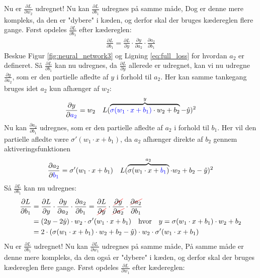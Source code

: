 \documentclass{article}
\newcommand{\figureref}[1]{Figur \ref{#1}}
\newcommand\Ccancel[2][black]{
    \let\OldcancelColor\CancelColor
    \renewcommand\CancelColor{\color{#1}}
    \cancel{#2}
    \renewcommand\CancelColor{\OldcancelColor}
}
\begin{document}
Nu er $\frac{\partial L}{\partial w_2}$ udregnet! Nu kan $\frac{\partial L}{\partial b_1}$ udregnes på samme måde, Dog er denne mere kompleks, da den er "dybere" i kæden, og derfor skal der bruges kædereglen flere gange. Først opdeles $\frac{\partial L}{\partial b_1}$ efter kædereglen:
\begin{align}
  \frac{\partial L}{\partial b_1} = \frac{\partial L}{\partial y} \cdot \frac{\partial y}{\partial a_2} \cdot \frac{\partial a_2}{\partial b_1}
\end{align}
Beskue \figureref{fig:neural_network3} og Ligning \eqref{eq:full_loss} for hvordan $a_2$ er defineret. Så $\frac{\partial L}{\partial b_1}$ kan nu udregnes, da $\frac{\partial L}{\partial y}$ allerede er udregnet, kan vi nu udregne $\frac{\partial y}{\partial a_2}$, som er den partielle afledte af $y$ i forhold til $a_2$. Her kan samme tankegang bruges idet $a_2$ kun afhænger af $w_2$:
\begin{align}
  \frac{\partial y}{\partial {\color{blue}a_2}} = w_2 && L(\overbrace{{\color{blue}\sigma(w_1 \cdot x + b_1)} \cdot w_2 + b_2}^{y}  - \hat{y})^2
\end{align}
Nu kan $\frac{\partial a_2}{\partial b_1}$ udregnes, som er den partielle afledte af $a_2$ i forhold til $b_1$. Her vil den partielle afledte være $\sigma'(w_1 \cdot x + b_1)$, da $a_2$ afhænger direkte af $b_2$ gennem aktiveringsfunktionen
\begin{align}
  \frac{\partial a_2}{\partial {\color{blue}b_1}} = \sigma'(w_1 \cdot x + b_1) && L(\overbrace{\sigma(w_1 \cdot x + {\color{blue}b_1})}^{a_2} \cdot w_2 + b_2 - \hat{y})^2
\end{align}
Så $\frac{\partial L}{\partial b_1}$ kan nu udregnes:
\begin{align}
  \frac{\partial L}{\partial b_1} &= \frac{\partial L}{\partial y} \cdot \frac{\partial y}{\partial a_2} \cdot \frac{\partial a_2}{\partial b_1} = \frac{\partial L}{\Ccancel[red]{\partial y}} \cdot \frac{\Ccancel[red]{\partial y}}{\Ccancel[red]{\partial a_2}} \cdot \frac{\Ccancel[red]{\partial a_2}}{\partial b_1}\\
  &= (2y - 2\hat{y}) \cdot w_2 \cdot \sigma'(w_1 \cdot x + b_1) \quad\text{hvor}\quad y = \sigma(w_1 \cdot x + b_1) \cdot w_2 + b_2\\
  &= 2\cdot(\sigma(w_1 \cdot x + b_1) \cdot w_2 + b_2 - \hat{y}) \cdot w_2 \cdot \sigma'(w_1 \cdot x + b_1)
\end{align}
Nu er $\frac{\partial L}{\partial b_1}$ udregnet! Nu kan $\frac{\partial L}{\partial w_1}$ udregnes på samme måde, På samme måde er denne mere kompleks, da den også er "dybere" i kæden, og derfor skal der bruges kædereglen flere gange. Først opdeles $\frac{\partial L}{\partial w_1}$ efter kædereglen:
\end{document}
